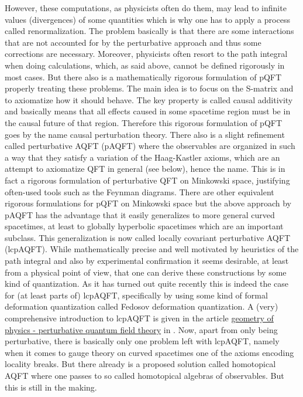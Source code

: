 However, these computations, as physicists often do them, may lead to infinite values ({\glqq}divergences{\grqq}) of some quantities which is why one has to apply a process called renormalization. The problem basically is that there are some interactions that are not accounted for by the perturbative approach and thus some corrections are necessary. Moreover, physicists often resort to the path integral when doing calculations, which, as said above, cannot be defined rigorously in most cases. But there also is a mathematically rigorous formulation of pQFT properly treating these problems. The main idea is to focus on the S-matrix and to axiomatize how it should behave. The key property is called causal additivity and basically means that all effects caused in some spacetime region must be in the causal future of that region. Therefore this rigorous formulation of pQFT goes by the name causal perturbation theory. There also is a slight refinement called perturbative AQFT (pAQFT) where the observables are organized in such a way that they satisfy a variation of the Haag-Kastler axioms, which are an attempt to axiomatize QFT in general (see below), hence the name. This is in fact a rigorous formulation of perturbative QFT on Minkowski space, justifying often-used tools such as the Feynman diagrams. There are other equivalent rigorous formulations for pQFT on Minkowski space but the above approach by pAQFT has the advantage that it easily generalizes to more general curved spacetimes, at least to globally hyperbolic spacetimes which are an important subclass. This generalization is now called locally covariant perturbative AQFT (lcpAQFT). While mathematically precise and well motivated by heuristics of the path integral and also by experimental confirmation it seems desirable, at least from a physical point of view, that one can derive these constructions by some kind of quantization. As it has turned out quite recently this is indeed the case for (at least parts of) lcpAQFT, specifically by using some kind of formal deformation quantization called Fedosov deformation quantization. A (very) comprehensive introduction to lcpAQFT is given in the article \href{https://ncatlab.org/nlab/show/geometry+of+physics+--+perturbative+quantum+field+theory}{geometry of physics - perturbative quantum field theory} in \cite{wiki-nlab0000}. Now, apart from only being perturbative, there is basically only one problem left with lcpAQFT, namely when it comes to gauge theory on curved spacetimes one of the axioms encoding locality breaks. But there already is a proposed solution called homotopical AQFT where one passes to so called homotopical algebras of observables. But this is still in the making.
